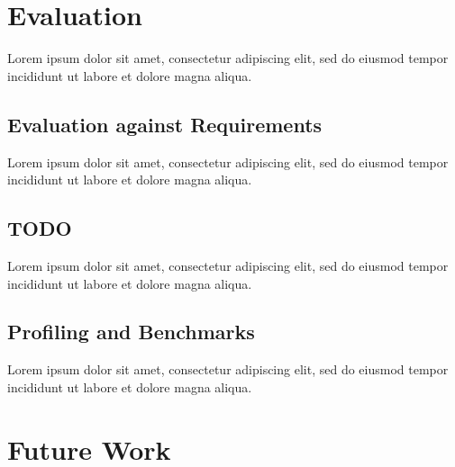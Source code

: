 \documentclass[12pt, a4paper]{article}
\begin{document}

\section{Evaluation}

Lorem ipsum dolor sit amet, consectetur adipiscing elit, sed do eiusmod tempor incididunt ut labore et dolore magna aliqua.


\subsection{Evaluation against Requirements}

Lorem ipsum dolor sit amet, consectetur adipiscing elit, sed do eiusmod tempor incididunt ut labore et dolore magna aliqua.


\subsection{TODO}

Lorem ipsum dolor sit amet, consectetur adipiscing elit, sed do eiusmod tempor incididunt ut labore et dolore magna aliqua.


\subsection{Profiling and Benchmarks}

Lorem ipsum dolor sit amet, consectetur adipiscing elit, sed do eiusmod tempor incididunt ut labore et dolore magna aliqua.

\pagebreak


\section{Future Work}


\end{document}
